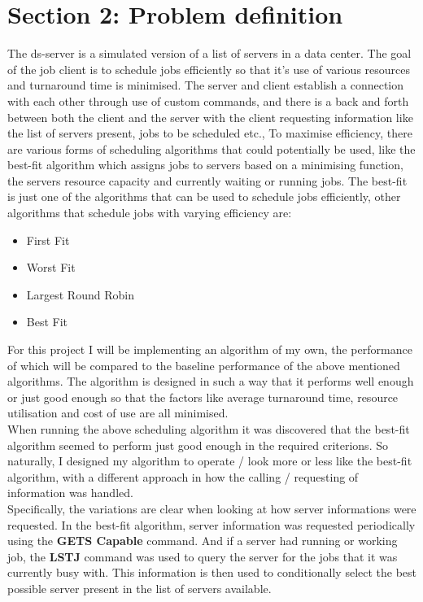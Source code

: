 \documentclass[a4paper]{article} %
\begin{document}
\section*{Section 2: Problem definition}\label{sec:section2}

The ds-server is a simulated version of a list of servers in a data center. The goal of the job client is to schedule 
jobs efficiently so that it's use of various resources and turnaround time is minimised. The server and client establish a 
connection with each other through use of custom commands, and there is a back and forth between both the client and the server
with the client requesting information like the list of servers present, jobs to be scheduled etc., To maximise efficiency, there 
are various forms of scheduling algorithms that could potentially be used, like the best-fit algorithm which assigns jobs 
to servers based on a minimising function, the servers resource capacity and currently waiting or running jobs. The best-fit is just one of the algorithms 
that can be used to schedule jobs efficiently, other algorithms that schedule jobs with varying efficiency are: 

\begin{itemize}
    \item First Fit 
    \item Worst Fit 
    \item Largest Round Robin
    \item Best Fit 
\end{itemize}

For this project I will be implementing an algorithm of my own, the performance of which will be compared to the baseline performance 
of the above mentioned algorithms. The algorithm is designed in such a way that it performs well enough or just good enough so
that the factors like average turnaround time, resource utilisation and cost of use are all minimised. \\

When running the above scheduling algorithm it was discovered that the best-fit algorithm seemed to perform just good enough 
in the required criterions. So naturally, I designed my algorithm to operate / look more or less like the best-fit algorithm, 
with a different approach in how the calling / requesting of information was handled. \\

Specifically, the variations are clear when looking at how server informations were requested. In the best-fit algorithm, 
server information was requested periodically using the \textbf{GETS Capable} command. And if a server had running or working job, 
the \textbf{LSTJ} command was used to query the server for the jobs that it was currently busy with. This information is then used to 
conditionally select the best possible server present in the list of servers available. \\
\end{document}
